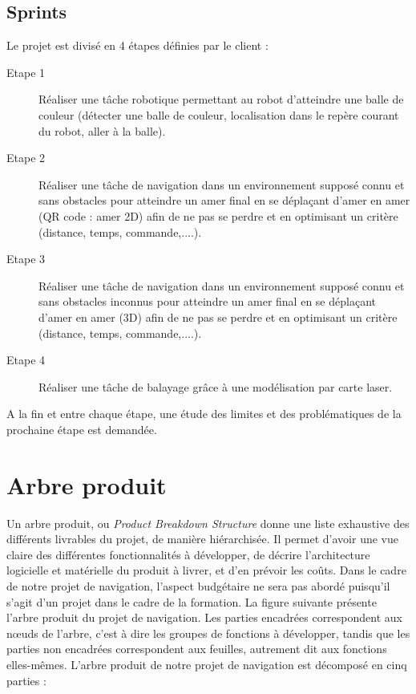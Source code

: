 \documentclass[10pt,a4paper]{article}
\begin{document}
\subsection{Sprints}

\noindent Le projet est divisé en 4 étapes définies par le client : 

\begin{description}

\item [Etape 1] Réaliser une tâche robotique permettant au robot d’atteindre une balle de couleur (détecter une balle de couleur, localisation dans le repère courant du robot, aller à la balle).

\item [Etape 2] Réaliser une tâche de navigation dans un environnement supposé connu et sans obstacles pour atteindre un amer final en se déplaçant d’amer en amer (QR code : amer 2D) afin de ne pas se perdre et en optimisant un critère (distance, temps, commande,....).

\item [Etape 3] Réaliser une tâche de navigation dans un environnement supposé connu et sans obstacles inconnus pour atteindre un amer final en se déplaçant d’amer en amer (3D) afin de ne pas se perdre et en optimisant un critère (distance, temps, commande,....).

\item [Etape 4] Réaliser une tâche de balayage grâce à une modélisation par carte laser.

\end{description}

A la fin et entre chaque étape, une étude des limites et des problématiques de la prochaine étape est demandée.


\section{Arbre produit}

Un arbre produit, ou \textit{Product Breakdown Structure} donne une liste exhaustive des différents livrables du projet, de manière hiérarchisée. Il permet d’avoir une vue claire des différentes fonctionnalités à développer, de décrire l’architecture logicielle et matérielle du produit à livrer, et d’en prévoir les coûts. Dans le cadre de notre projet de navigation, l’aspect budgétaire ne sera pas abordé puisqu’il s’agit d’un projet dans le cadre de la formation.
La figure suivante présente l’arbre produit du projet de navigation. Les parties encadrées correspondent aux nœuds de l’arbre, c’est à dire les groupes de fonctions à développer, tandis que les parties non encadrées correspondent aux feuilles, autrement dit aux fonctions elles-mêmes.
L’arbre produit de notre projet de navigation est décomposé en cinq parties :
\end{document}
